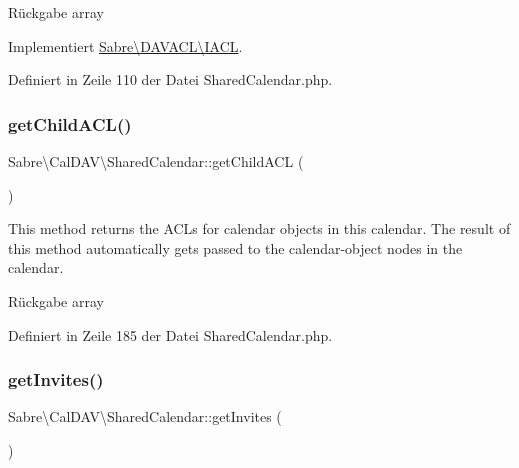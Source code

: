 \begin{DoxyReturn}{Rückgabe}
array 
\end{DoxyReturn}


Implementiert \mbox{\hyperlink{interface_sabre_1_1_d_a_v_a_c_l_1_1_i_a_c_l_a8fe3b3a5b48eae789d7eb722b340045c}{Sabre\textbackslash{}\+D\+A\+V\+A\+C\+L\textbackslash{}\+I\+A\+CL}}.



Definiert in Zeile 110 der Datei Shared\+Calendar.\+php.

\mbox{\label{class_sabre_1_1_cal_d_a_v_1_1_shared_calendar_a8cd7a4f9142e95e15052370c34a30cc7}} 
\subsubsection{\texorpdfstring{get\+Child\+A\+C\+L()}{getChildACL()}}
{\footnotesize\ttfamily Sabre\textbackslash{}\+Cal\+D\+A\+V\textbackslash{}\+Shared\+Calendar\+::get\+Child\+A\+CL (\begin{DoxyParamCaption}{ }\end{DoxyParamCaption})}

This method returns the A\+CL\textquotesingle{}s for calendar objects in this calendar. The result of this method automatically gets passed to the calendar-\/object nodes in the calendar.

\begin{DoxyReturn}{Rückgabe}
array 
\end{DoxyReturn}


Definiert in Zeile 185 der Datei Shared\+Calendar.\+php.

\mbox{\label{class_sabre_1_1_cal_d_a_v_1_1_shared_calendar_afb00675ab09e20eb1b1542c7b482119d}} 
\subsubsection{\texorpdfstring{get\+Invites()}{getInvites()}}
{\footnotesize\ttfamily Sabre\textbackslash{}\+Cal\+D\+A\+V\textbackslash{}\+Shared\+Calendar\+::get\+Invites (\begin{DoxyParamCaption}{ }\end{DoxyParamCaption})}

